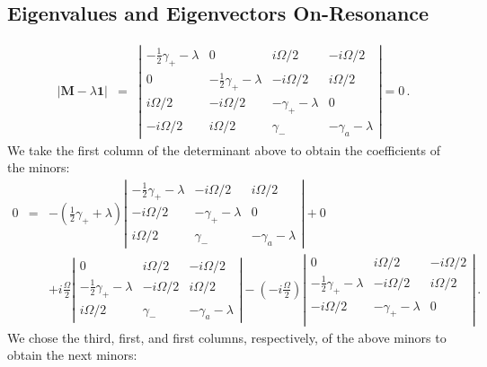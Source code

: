 \documentclass[twocolumn,aps,eqsecnum,showkeys,amsmath]{revtex4-2}
\begin{document}
\begin{widetext}
\section{Eigenvalues and Eigenvectors On-Resonance 
\label{sec:MatrixEigensystem}} 
%
\begin{eqnarray} 	
| \mathbf{M} -\lambda \mathbf{1} | &=& \left| \begin{array}{cccc}
-\frac{1}{2} \gamma_+ -\lambda & 0 & i\Omega/2 & -i\Omega/2 \\ 
0 & -\frac{1}{2} \gamma_+ -\lambda & -i\Omega/2 & i\Omega/2 	 \\ 
i\Omega/2 & -i\Omega/2 & -\gamma_+ -\lambda & 0 		\\ 
-i\Omega/2 & i\Omega/2 & \gamma_- & -\gamma_a -\lambda
\end{array}  \right| 	=0 	\,.
\end{eqnarray}
We take the first column of the determinant above to obtain the coefficients 
of the minors:
%
\begin{eqnarray*} 	
0 &=& -(\frac{1}{2} \gamma_+ +\lambda) 
	\left| \begin{array}{ccc}
	-\frac{1}{2} \gamma_+ -\lambda & -i\Omega/2 & i\Omega/2 	 \\ 
	-i\Omega/2 & -\gamma_+ -\lambda & 0 		\\ 
	i\Omega/2 & \gamma_- & -\gamma_a -\lambda
	\end{array}  \right| 	+0 	\\ 
%
&& +i \frac{\Omega}{2}  \left| \begin{array}{ccc}
	0 & i\Omega/2 & -i\Omega/2 \\ 
	-\frac{1}{2} \gamma_+ -\lambda & -i\Omega/2 & i\Omega/2 	 \\ 
	i\Omega/2 & \gamma_- & -\gamma_a -\lambda
	\end{array}  \right| 	
%
	- \left( - i \frac{\Omega}{2} \right)  \left| \begin{array}{ccc}
	0 & i\Omega/2 & -i\Omega/2 \\ 
	-\frac{1}{2} \gamma_+ -\lambda & -i\Omega/2 & i\Omega/2 	 \\ 
	-i\Omega/2 & -\gamma_+ -\lambda & 0 		\\ 
	\end{array}  \right| 	\,.
\end{eqnarray*}
We chose the third, first, and first columns, respectively, of the above minors 
to obtain the next minors: 
%
\begin{eqnarray*} 	

\end{eqnarray*}
\end{widetext}
\end{document}
